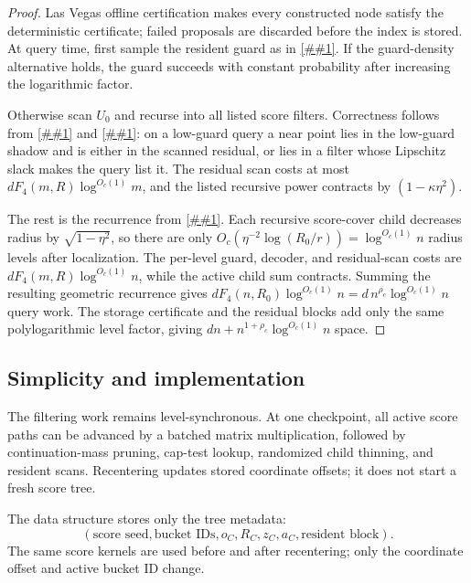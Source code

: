 \documentclass[10pt]{article}
\newcommand{\cref}[1]{\ref{##1}}
\theoremstyle{definition}
\begin{document}
\begin{proof}
   Las Vegas offline certification makes every constructed node satisfy the
   deterministic certificate; failed proposals are discarded before the index is
   stored.  At query time, first sample the resident guard as in
   \cref{prop:power-cover-polylog}.  If the guard-density alternative holds,
   the guard succeeds with constant probability after increasing the logarithmic
   factor.

   Otherwise scan $U_0$ and recurse into all listed score filters.  Correctness
   follows from \cref{lem:low-guard-shadow} and
   \cref{lem:lipschitz-score-cover}: on a low-guard query a near point lies in
   the low-guard shadow and is either in the scanned residual, or lies in a
   filter whose Lipschitz slack makes the query list it.
   The residual scan costs at most
   $dF_4(m,R)\log^{O_c(1)}m$, and the listed recursive power contracts by
   $(1-\kappa\eta^2)$.

   The rest is the recurrence from \cref{prop:power-cover-polylog}.  Each
   recursive score-cover child decreases radius by
   $\sqrt{1-\eta^2}$, so there are only
   $O_c(\eta^{-2}\log(R_0/r))=\log^{O_c(1)}n$ radius levels after
   localization.  The per-level guard, decoder, and residual-scan costs are
   $dF_4(m,R)\log^{O_c(1)}n$, while the active child sum contracts.  Summing the
   resulting geometric recurrence gives
   $dF_4(n,R_0)\log^{O_c(1)}n=d\,n^{\rho_c}\log^{O_c(1)}n$ query work.  The
   storage certificate and the residual blocks add only the same polylogarithmic
   level factor, giving $dn+n^{1+\rho_c}\log^{O_c(1)}n$ space.
\end{proof}

\subsection{Simplicity and implementation}

The filtering work remains level-synchronous. At one checkpoint, all active score paths can be advanced by a batched matrix multiplication, followed by continuation-mass pruning, cap-test lookup, randomized child thinning, and resident scans. Recentering updates stored coordinate offsets; it does not start a fresh score tree.

The data structure stores only the tree metadata:
\[
   (\text{score seed},\text{bucket IDs},o_C,R_C,z_C,a_C,\text{resident block}).
\]
The same score kernels are used before and after recentering; only the coordinate offset and active bucket ID change.
\end{document}
